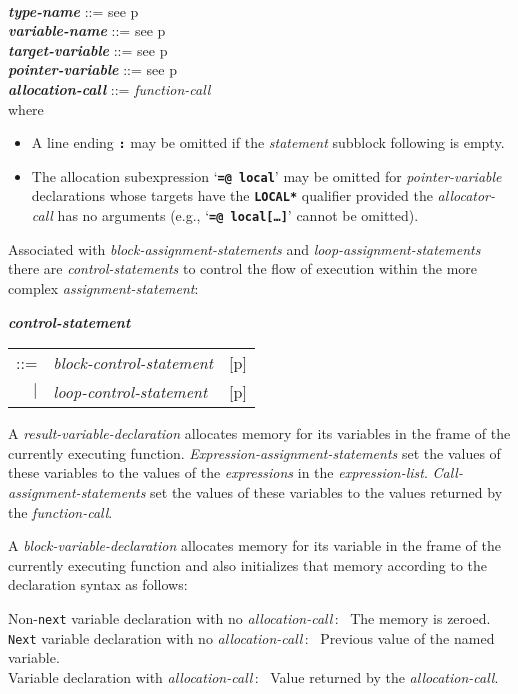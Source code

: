 \documentclass[12pt]{article}
\newcommand{\TT}[1]{{\tt \bfseries #1}}
\newcommand{\emkey}[1]{{\em \bfseries #1}}
\newcommand{\pagref}[1]{p\pageref{#1}}
\newenvironment{indpar}[1][0.3in]%
	{\begin{list}{}%
		     {\setlength{\itemsep}{0in}%
		      \setlength{\topsep}{0in}%
		      \setlength{\parsep}{1ex}%
		      \setlength{\labelwidth}{#1}%
		      \setlength{\leftmargin}{#1}%
		      \addtolength{\leftmargin}{\labelsep}}%
	 \item}%
	{\end{list}}
\begin{document}
\begin{indpar}
\\[0.5ex]
\emkey{type-name} ::= see \pagref{TYPE-NAME}
\\[0.5ex]
\emkey{variable-name} ::= see \pagref{VARIABLE-NAME}
\\[0.5ex]
\emkey{target-variable} ::= see \pagref{TARGET-VARIABLE}
\\[0.5ex]
\emkey{pointer-variable} ::= see \pagref{POINTER-VARIABLE}
\\[0.5ex]
\emkey{allocation-call} ::= {\em function-call}
\\[2ex]
where
\begin{itemize}
\item A line ending \TT{:} may be omitted if the
{\em statement} subblock following is empty.
\item The allocation subexpression `\TT{=@ local}' may be
omitted for {\em pointer-variable} declarations whose
targets have the \TT{*LOCAL*} qualifier provided the
{\em allocator-call} has no arguments
(e.g., `\TT{=@ local[\ldots]}' cannot be omitted).
\end{itemize}

\end{indpar}

Associated with {\em block-assignment-statements} and
{\em loop-assignment-statements}
there are {\em con\-trol-statements}
to control the flow of execution within the more complex
{\em assignment-state\-ment}:
\begin{indpar}
\emkey{control-statement}\label{CONTROL-STATEMENT}
    \begin{tabular}[t]{@{}rll}
    ::= & {\em block-control-statement}
        & [\pagref{BLOCK-CONTROL-STATEMENT}] \\
    $|$ & {\em loop-control-statement}
        & [\pagref{LOOP-CONTROL-STATEMENT}] \\
    \end{tabular}
\end{indpar}

A {\em result-variable-declaration} allocates memory for its variables
in the frame of the currently executing function.
{\em Expression-assignment-statements} set the values of these variables
to the values of the {\em expressions} in the {\em expression-list}.
{\em Call-assignment-statements} set the values of these variables
to the values returned by the {\em function-call}.

A {\em block-variable-declaration}
allocates memory for its variable
in the frame of the currently executing function and also initializes
that memory according to the declaration syntax as follows:
\begin{indpar}[0.05in]
Non-{\tt next} variable declaration with no {\em allocation-call}\,:~
The memory is zeroed. \\
{\tt Next} variable declaration with no {\em allocation-call}\,:~
Previous value of the named variable. \\
Variable declaration with {\em allocation-call}\,:~
Value returned by the {\em allocation-call}.
\end{indpar}
\end{document}
